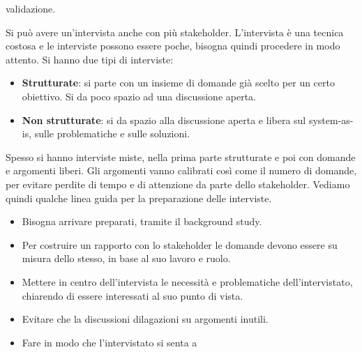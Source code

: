 \begin{itemize}
\begin{enumerate}
\begin{itemize}
                                    validazione.
                        \end{itemize}
                        Si può avere un'intervista anche con più stakeholder.
                        L'intervista è una tecnica costosa e le interviste possono
                        essere poche, bisogna quindi procedere in modo attento.
                        Si hanno due tipi di interviste:
                        \begin{itemize}
                              \item \textbf{Strutturate}: si parte con un insieme
                                    di domande già scelto per un certo obiettivo.
                                    Si da poco spazio ad una discussione aperta.
                              \item \textbf{Non strutturate}: si da spazio alla
                                    discussione aperta e libera sul system-as-is,
                                    sulle problematiche e sulle soluzioni.
                        \end{itemize}
                        Spesso si hanno interviste miste, nella prima parte
                        strutturate e poi con domande e argomenti liberi. Gli
                        argomenti vanno calibrati così come il numero di domande,
                        per evitare perdite di tempo e di attenzione da parte
                        dello stakeholder. Vediamo quindi qualche linea guida per
                        la preparazione delle interviste.
                        \begin{itemize}
                              \item Bisogna arrivare preparati, tramite il
                                    background study.
                              \item Per costruire un rapporto con lo stakeholder
                                    le domande devono essere su misura dello stesso,
                                    in base al suo lavoro e ruolo.
                              \item Mettere in centro dell'intervista le necessità
                                    e problematiche dell'intervistato, chiarendo
                                    di essere interessati al suo punto di vista.
                              \item Evitare che la discussioni dilagazioni su argomenti
                                    inutili.
                              \item Fare in modo che l'intervistato si senta a

\end{itemize}
\end{enumerate}
\end{itemize}
